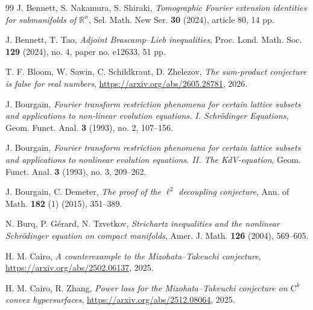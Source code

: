 \documentclass[11pt,reqno]{amsart}
\numberwithin{equation}{section}
\begin{document}
\begin{thebibliography}{99}
 J. Bennett, S. Nakamura, S. Shiraki, \textit{Tomographic Fourier extension identities for submanifolds of $\mathbb{R}^n$}, Sel. Math. New Ser. \textbf{30} (2024), article 80, 14 pp. 

 J. Bennett, T. Tao, \textit{Adjoint Brascamp--Lieb inequalities}, Proc. Lond. Math. Soc. \textbf{129} (2024), no. 4, paper no. e12633, 51 pp.


 T. F. Bloom, W. Sawin, C. Schildkraut, D. Zhelezov, \textit{The sum-product conjecture is false for real numbers}, \url{https://arxiv.org/abs/2605.28781}, 2026.


 J. Bourgain, \textit{Fourier transform restriction phenomena for certain lattice subsets and applications to non-linear evolution equations. I. Schr\"{o}dinger Equations}, Geom. Funct. Anal. \textbf{3} (1993), no. 2, 107--156.

 J. Bourgain, \textit{Fourier transform restriction phenomena for certain lattice subsets and applications to nonlinear evolution equations. II. The KdV-equation}, Geom. Funct. Anal. \textbf{3} (1993), no. 3, 209--262.


 J. Bourgain, C. Demeter, \textit{The proof of the $\ell^2$ decoupling conjecture}, Ann. of Math. \textbf{182} (1) (2015), 351--389.

 N. Burq, P. G\'{e}rard, N. Tzvetkov, \textit{Strichartz inequalities and the nonlinear Schr\"{o}dinger equation on compact manifolds}, Amer. J. Math. \textbf{126} (2004), 569--605. 


 H. M. Cairo, \textit{A counterexample to the Mizohata--Takeuchi conjecture}, \url{https://arxiv.org/abs/2502.06137}, 2025.

 H. M. Cairo, R. Zhang, \textit{Power loss for the Mizohata--Takeuchi conjecture on $\mathrm{C}^k$ convex hypersurfaces}, \url{https://arxiv.org/abs/2512.08064}, 2025.


\end{thebibliography}
\end{document}
